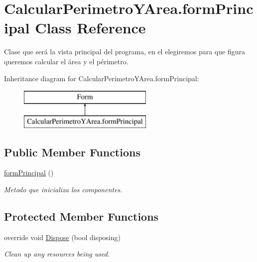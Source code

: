 \hypertarget{class_calcular_perimetro_y_area_1_1form_principal}{}\section{Calcular\+Perimetro\+Y\+Area.\+form\+Principal Class Reference}
\label{class_calcular_perimetro_y_area_1_1form_principal}


Clase que será la vista principal del programa, en el elegiremos para que figura queremos calcular el área y el périmetro.  


Inheritance diagram for Calcular\+Perimetro\+Y\+Area.\+form\+Principal\+:\begin{figure}[H]
\begin{center}
\leavevmode
\includegraphics[height=2.000000cm]{class_calcular_perimetro_y_area_1_1form_principal}
\end{center}
\end{figure}
\subsection*{Public Member Functions}
\begin{DoxyCompactItemize}
\item 
\hyperlink{class_calcular_perimetro_y_area_1_1form_principal_a6a27d2db038189fc9856ce958495ffd0}{form\+Principal} ()
\begin{DoxyCompactList}\small\item\em Metodo que inicializa los componentes. \end{DoxyCompactList}\end{DoxyCompactItemize}
\subsection*{Protected Member Functions}
\begin{DoxyCompactItemize}
\item 
override void \hyperlink{class_calcular_perimetro_y_area_1_1form_principal_aa215d44c5c947aedfec46f810d0120dc}{Dispose} (bool disposing)
\begin{DoxyCompactList}\small\item\em Clean up any resources being used. \end{DoxyCompactList}\end{DoxyCompactItemize}


